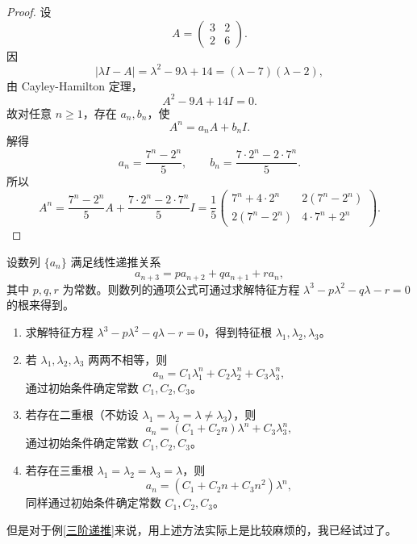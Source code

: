 \begin{proof}
设
\[
A=\begin{pmatrix}3&2\\2&6\end{pmatrix}.
\]
因
\[
|\lambda I-A|=\lambda^2-9\lambda+14=(\lambda-7)(\lambda-2),
\]
由 Cayley-Hamilton 定理，
\[
A^2-9A+14I=0.
\]
故对任意 \(n\ge1\)，存在 \(a_n,b_n\)，使
\[
A^n=a_nA+b_nI.
\]
解得
\[
a_n=\frac{7^n-2^n}{5},\qquad
b_n=\frac{7\cdot 2^n-2\cdot 7^n}{5}.
\]
所以
\[
A^n=
\frac{7^n-2^n}{5}A+\frac{7\cdot 2^n-2\cdot 7^n}{5}I
=
\frac15
\begin{pmatrix}
7^n+4\cdot 2^n & 2(7^n-2^n)\\
2(7^n-2^n) & 4\cdot 7^n+2^n
\end{pmatrix}.
\]
\end{proof}





\begin{lemma} 
设数列 \(\{a_n\}\) 满足线性递推关系
\[
a_{n+3} = p a_{n+2} + q a_{n+1} + r a_n,
\]
其中 $p, q, r$ 为常数。则数列的通项公式可通过求解特征方程 $\lambda^3 - p\lambda^2 - q\lambda - r = 0$ 的根来得到。
\begin{enumerate}[label=step~\arabic*]
\item 求解特征方程 $\lambda^3 - p\lambda^2 - q\lambda - r = 0$，得到特征根 $\lambda_1, \lambda_2, \lambda_3$。
\item 若 $\lambda_1, \lambda_2, \lambda_3$ 两两不相等，则
\[
a_n = C_1 \lambda_1^n + C_2 \lambda_2^n + C_3 \lambda_3^n,
\]
通过初始条件确定常数 $C_1, C_2, C_3$。
\item 若存在二重根（不妨设 $\lambda_1 = \lambda_2 = \lambda \neq \lambda_3$），则
\[
a_n = (C_1 + C_2 n)\lambda^n + C_3 \lambda_3^n,
\]
通过初始条件确定常数 $C_1, C_2, C_3$。
\item 若存在三重根 $\lambda_1 = \lambda_2 = \lambda_3 = \lambda$，则
\[
a_n = (C_1 + C_2 n + C_3 n^2)\lambda^n,
\]
同样通过初始条件确定常数 $C_1, C_2, C_3$。
\end{enumerate}
\end{lemma}


\begin{remark}
但是对于例\ref{三阶递推}来说，用上述方法实际上是比较麻烦的，我已经试过了。
\end{remark}


\vspace{2mm}

